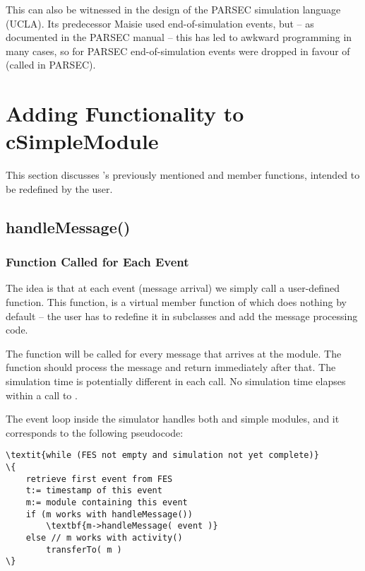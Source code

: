 This can also be witnessed in the design of the PARSEC
simulation language (UCLA). Its predecessor Maisie used
end-of-simulation events, but -- as documented in the PARSEC manual --
this has led to awkward programming in many cases, so for PARSEC
end-of-simulation events were dropped in favour of 
(called  in PARSEC).


\section{Adding Functionality to cSimpleModule}
\label{sec:simple-modules:handlemessage-and-activity}

This section discusses 's previously mentioned
 and  member functions, intended
to be redefined by the user.


\subsection{handleMessage()}
\label{sec:simple-modules:handlemessage}

\subsubsection{Function Called for Each Event}
\label{sec:simple-modules:handlemessage:overview}

The idea is that at each event (message arrival) we
simply call a user-defined function. This function,
 is a
virtual member function of  which does
nothing by default -- the user has to redefine it in subclasses
and add the message processing code.

The  function will be called for every message
that arrives at the module. The function should process the message
and return immediately after that. The simulation time is potentially
different in each call. No simulation time elapses within a call
to .

The event loop inside the simulator handles both 
and  simple modules, and it corresponds
to the following pseudocode:

\begin{Verbatim}[commandchars=\\\{\}]
\textit{while (FES not empty and simulation not yet complete)}
\{
    retrieve first event from FES
    t:= timestamp of this event
    m:= module containing this event
    if (m works with handleMessage())
        \textbf{m->handleMessage( event )}
    else // m works with activity()
        transferTo( m )
\}
\end{Verbatim}

